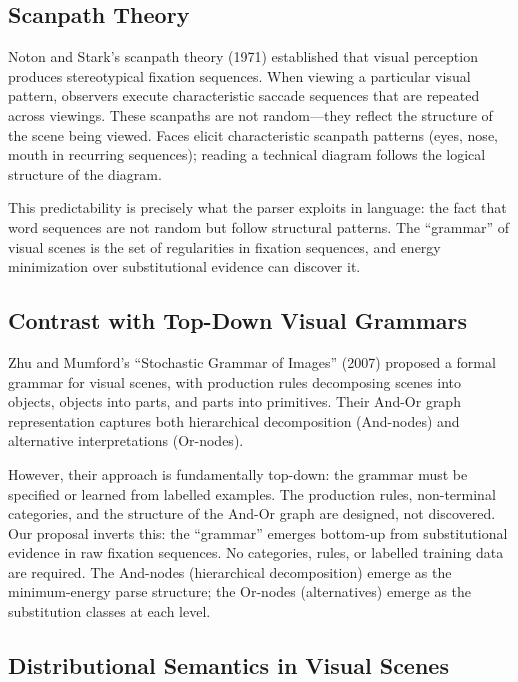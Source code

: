 \documentclass[11pt,a4paper]{article}
\begin{document}
\subsection{Scanpath Theory}

Noton and Stark's scanpath theory (1971) established that visual perception produces stereotypical fixation sequences. When viewing a particular visual pattern, observers execute characteristic saccade sequences that are repeated across viewings. These scanpaths are not random---they reflect the structure of the scene being viewed. Faces elicit characteristic scanpath patterns (eyes, nose, mouth in recurring sequences); reading a technical diagram follows the logical structure of the diagram.

This predictability is precisely what the parser exploits in language: the fact that word sequences are not random but follow structural patterns. The ``grammar'' of visual scenes is the set of regularities in fixation sequences, and energy minimization over substitutional evidence can discover it.

\subsection{Contrast with Top-Down Visual Grammars}

Zhu and Mumford's ``Stochastic Grammar of Images'' (2007) proposed a formal grammar for visual scenes, with production rules decomposing scenes into objects, objects into parts, and parts into primitives. Their And-Or graph representation captures both hierarchical decomposition (And-nodes) and alternative interpretations (Or-nodes).

However, their approach is fundamentally top-down: the grammar must be specified or learned from labelled examples. The production rules, non-terminal categories, and the structure of the And-Or graph are designed, not discovered. Our proposal inverts this: the ``grammar'' emerges bottom-up from substitutional evidence in raw fixation sequences. No categories, rules, or labelled training data are required. The And-nodes (hierarchical decomposition) emerge as the minimum-energy parse structure; the Or-nodes (alternatives) emerge as the substitution classes at each level.

\subsection{Distributional Semantics in Visual Scenes}
\end{document}
